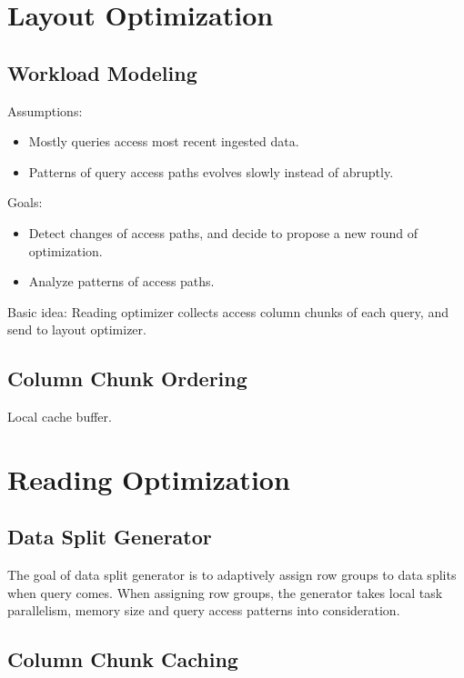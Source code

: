 \section{Layout Optimization}
\label{sec:layout-optimization}

\subsection{Workload Modeling}
\label{subsec:workload-modeling}
Assumptions:
\begin{itemize}
	\item Mostly queries access most recent ingested data.
	\item Patterns of query access paths evolves slowly instead of abruptly.
\end{itemize}

Goals:
\begin{itemize}
	\item Detect changes of access paths, and decide to propose a new round of optimization.
	\item Analyze patterns of access paths.
\end{itemize}

Basic idea: Reading optimizer collects access column chunks of each query, and send to layout optimizer.

\subsection{Column Chunk Ordering}
\label{subsec:column-chunk-ordering}
Local cache buffer.

\section{Reading Optimization}
\label{sec:reading-optimization}


\subsection{Data Split Generator}
\label{subsec:data-splitting}
The goal of data split generator is to adaptively assign row groups to data splits when query comes.
When assigning row groups, the generator takes local task parallelism, memory size and query access patterns into consideration. 

\subsection{Column Chunk Caching}
\label{subsec:chunk-caching}
